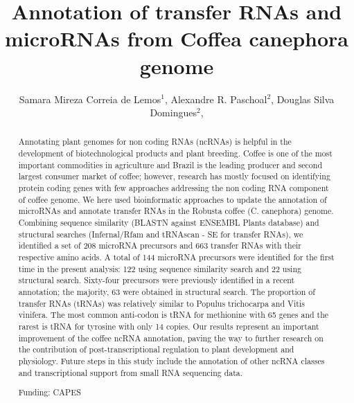 \documentclass[twoside]{article}
\title{\vspace{-15mm}\fontsize{24pt}{10pt}\selectfont\textbf{ Annotation of transfer RNAs and microRNAs from Coffea canephora genome }} %
\author{ Samara Mireza Correia de Lemos$^{1}$, Alexandre R. Paschoal$^{2}$, Douglas Silva Domingues$^{2}$, }
\affil{ 1 Universidade Tecnológica Federal do Paraná

2 UTFPR - PPGBIOINFO

 }
\date{}
\begin{document}
  
  
  \maketitle %
  
  
  \thispagestyle{fancy} %
  
  
  \begin{abstract}
  Annotating plant genomes for non coding RNAs (ncRNAs) is helpful in the development of biotechnological products and plant breeding. Coffee is one of the most important commodities in agriculture and Brazil is the leading producer and second largest consumer market of coffee; however, research has mostly focused on identifying protein coding genes with few approaches addressing the non coding RNA component of coffee genome.
We here used bioinformatic approaches to update the annotation of microRNAs and annotate transfer RNAs in the Robusta coffee (C. canephora) genome. 
Combining sequence similarity (BLASTN against ENSEMBL Plants database) and structural searches (Infernal/Rfam and tRNAscan - SE for transfer RNAs), we identified a set of 208 microRNA precursors and 663 transfer RNAs with their respective amino acids.
A total of 144 microRNA precursors were identified for the first time in the present analysis: 122 using sequence similarity search and 22 using structural search. Sixty-four precursors were previously identified in a recent annotation; the majority, 63 were obtained in structural search. The proportion of transfer RNAs (tRNAs) was relatively similar to Populus trichocarpa and Vitis vinifera. The most common anti-codon is tRNA for methionine with 65 genes and the rarest is tRNA for tyrosine with only 14 copies.
    Our results represent an important improvement of the coffee ncRNA annotation, paving the way to further research on the contribution of post-transcriptional regulation to plant development and physiology. Future steps in this study include the annotation of other ncRNA classes and transcriptional support from small RNA sequencing data.
  
  Funding: CAPES \\ 
  \end{abstract}
  
\end{document}
